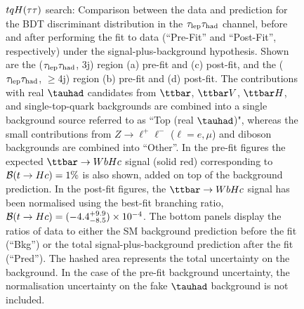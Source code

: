 \begin{figure}[htbp]
\begin{center}
\caption{\small{$tqH(\tau\tau)$ search: Comparison between the data and prediction for the BDT discriminant distribution in the
$\tau_{\mathrm{lep}} \tau_{\mathrm{had}}$ channel, before and after performing the fit to data  (``Pre-Fit'' and ``Post-Fit'', respectively) under the signal-plus-background hypothesis.
Shown are the ($\tau_{\mathrm{lep}} \tau_{\mathrm{had}}$, 3j) region (a) pre-fit and (c) post-fit, and the ($\tau_{\mathrm{lep}} \tau_{\mathrm{had}}$, $\geq$4j) region (b) pre-fit and (d) post-fit.
The contributions with real $\tauhad$ candidates from $\ttbar$,  $\ttbar V$, $\ttbar H$, and single-top-quark backgrounds are combined into
a single background source referred to as ``Top (real $\tauhad$)", whereas the small contributions from 
$Z\to \ell^+\ell^-$ ($\ell = e, \mu$) and diboson backgrounds are combined into ``Other''. 
In the pre-fit figures the expected $\Hc$ signal (solid red) corresponding to $\mathcal{B}(t\to Hc)=1\%$ is also shown,
added on top of the background prediction. In the post-fit figures, the $\Hc$ signal has been normalised using the best-fit branching ratio, 
$\mathcal{B}(t\to Hc)=(-4.4^{+9.9}_{-8.5})\times 10^{-4}$.
The bottom panels display the ratios of data to either the SM background prediction before the fit (``Bkg'')  or the total signal-plus-background
prediction after the fit (``Pred''). 
The hashed area represents the total uncertainty on the background. 
In the case of the pre-fit background uncertainty, the normalisation uncertainty on the fake $\tauhad$ background is not included.}}
\label{fig:prepostfit_unblinded_WbHc_lh}
\end{center}
\end{figure}

